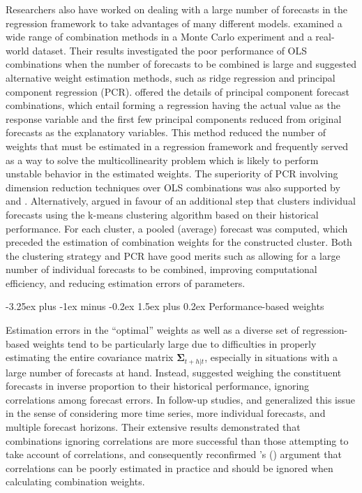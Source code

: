 \documentclass[11pt]{article}
\makeatletter
\def\citeapos#1{\citeauthor{#1}'s (\citeyear{#1})}
\renewcommand{\paragraph}{\@startsection{paragraph}{4}{0ex}%
   {-3.25ex plus -1ex minus -0.2ex}%
   {1.5ex plus 0.2ex}%
   {\normalfont\normalsize\bfseries}}
\makeatother
\begin{document}
Researchers also have worked on dealing with a large number of forecasts in the regression framework to take advantages of many different models. \citet{Chan1999-io} examined a wide range of combination methods in a Monte Carlo experiment and a real-world dataset. Their results investigated the poor performance of OLS combinations when the number of forecasts to be combined is large and suggested alternative weight estimation methods, such as ridge regression and principal component regression (PCR). \citet{Stock2004-rq} offered the details of principal component forecast combinations, which entail forming a regression having the actual value as the response variable and the first few principal components reduced from original forecasts as the explanatory variables. This method reduced the number of weights that must be estimated in a regression framework and frequently served as a way to solve the multicollinearity problem which is likely to perform unstable behavior in the estimated weights. The superiority of PCR involving dimension reduction techniques over OLS combinations was also supported by \citet{Rapach2008-jh} and \citet{Poncela2011-vz}. Alternatively, \citet{Aiolfi2006-rh} argued in favour of an additional step that clusters individual forecasts using the k-means clustering algorithm based on their historical performance. For each cluster, a pooled (average) forecast was computed, which preceded the estimation of combination weights for the constructed cluster. Both the clustering strategy and PCR have good merits such as allowing for a large number of individual forecasts to be combined, improving computational efficiency, and reducing estimation errors of parameters.

\paragraph{Performance-based weights}

Estimation errors in the ``optimal'' weights as well as a diverse set of regression-based weights tend to be particularly large due to difficulties in properly estimating the entire covariance matrix $\boldsymbol{\Sigma}_{t+h|t}$, especially in situations with a large number of forecasts at hand. Instead, \citet{Bates1969-yj} suggested weighing the constituent forecasts in inverse proportion to their historical performance, ignoring correlations among forecast errors. In follow-up studies, \citet{Newbold1974-lp} and \citet{Winkler1983-ra} generalized this issue in the sense of considering more time series, more individual forecasts, and multiple forecast horizons. Their extensive results demonstrated that combinations ignoring correlations are more successful than those attempting to take account of correlations, and consequently reconfirmed \citeapos{Bates1969-yj} argument that correlations can be poorly estimated in practice and should be ignored when calculating combination weights.
\end{document}
